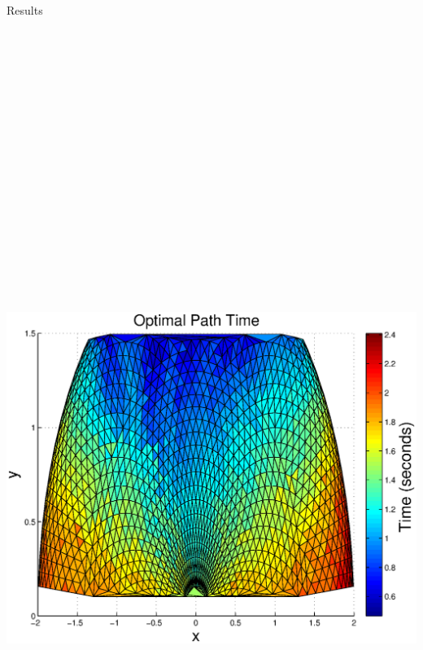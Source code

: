 \documentclass[final]{beamer}
\begin{document}
\begin{frame}{}
{\begin{columns}[t]
\begin{column}{.30\linewidth}



                
\begin{block}{\centering Results}

	\centering\includegraphics[height=30cm, width=30cm]{figures/Optimal_Path_Time.eps}


\end{block}
\end{column}
\end{columns}}
\end{frame}
\end{document}
